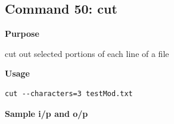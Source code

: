 \subsection{Command 50: cut} 
\textbf{Purpose}
\begin{flushleft}
 cut out selected portions of each line of a file
\end{flushleft}
\textbf{Usage}
\begin{verbatim}
cut --characters=3 testMod.txt
\end{verbatim}
\textbf{Sample i/p and o/p}
\begin{figure}[H] 
\end{figure}
